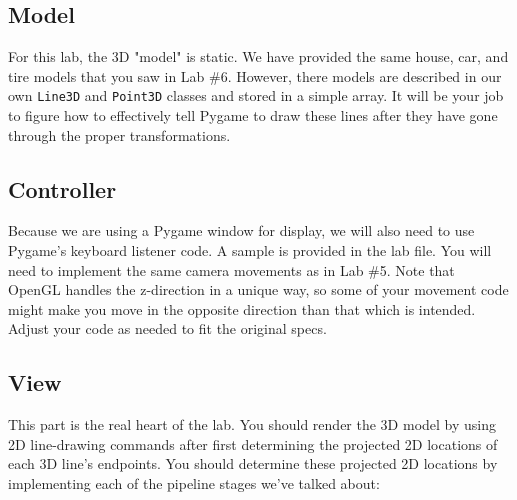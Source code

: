 \documentclass[11pt]{article}
\begin{document}
\subsection*{Model}

For this lab, the 3D "model" is static. We have provided the same house, car, and tire models that you saw in Lab \#6. However, there models are described in our own {\tt Line3D} and {\tt Point3D} classes and stored in a simple array. It will be your job to figure how to effectively tell Pygame to draw these lines after they have gone through the proper transformations.

\subsection*{Controller}

Because we are using a Pygame window for display, we will also need to use Pygame's keyboard listener code. A sample is provided in the lab file. You will need to implement the same camera movements as in Lab \#5. Note that OpenGL handles the z-direction in a unique way, so some of your movement code might make you move in the opposite direction than that which is intended. Adjust your code as needed to fit the original specs.

\subsection*{View}

This part is the real heart of the lab. You should render the 3D model by using 2D line-drawing commands after first determining the projected 2D locations of each 3D line's endpoints. You should determine these projected 2D locations by implementing each of the pipeline stages we've talked about:
\end{document}
